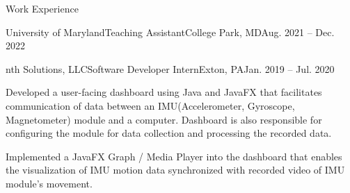 \documentclass{article}
\newlength{\tabin}
\newlength{\secsep}
\newcommand{\lineunder}{\vspace*{-8pt} \\ \hspace*{-6pt} \hrulefill \\ \vspace*{-15pt}}
\newenvironment{tabbedsection}[1]{
  \begin{list}{}{
      \setlength{\itemsep}{0pt}
      \setlength{\labelsep}{0pt}
      \setlength{\labelwidth}{0pt}
      \setlength{\leftmargin}{\tabin}
      \setlength{\rightmargin}{\tabin}
      \setlength{\listparindent}{0pt}
      \setlength{\parsep}{0pt}
      \setlength{\parskip}{0pt}
      \setlength{\partopsep}{0pt}
      \setlength{\topsep}{#1}
    }
  \item[]
}{\end{list}}
\newenvironment{resume_section}[1]{
  \filbreak
  \vspace{2\secsep}
  \textsc{\large#1}
  \lineunder
  \begin{tabbedsection}{\secsep}
}{\end{tabbedsection}}
\newenvironment{subitems}{
  \renewcommand{\labelitemi}{-}
  \begin{itemize}
      \setlength{\labelsep}{1em}
}{\end{itemize}}
\newenvironment{resume_employer}[4]{
  \vspace{\secsep}
  \textbf{#1} \\ 
  \indent {\small #2} \hfill {\footnotesize#3 (#4)} \hspace{-4em}
  \begin{tabbedsection}{0pt}
  \begin{subitems}
}{\end{subitems}\end{tabbedsection}}
\begin{document}
\begin{resume_section}{Work Experience}
\begin{resume_employer}{University of Maryland}{Teaching Assistant}{College Park, MD}{Aug. 2021 -- Dec. 2022}
\end{resume_employer}
  \begin{resume_employer}{nth Solutions, LLC}{Software Developer Intern}{Exton, PA}{Jan. 2019 -- Jul. 2020}
    \item Developed a user-facing dashboard using Java and JavaFX that facilitates communication of data between an IMU(Accelerometer, Gyroscope, Magnetometer) module and a computer. Dashboard is also responsible for configuring the module for data collection and processing the recorded data.
    \item Implemented a JavaFX Graph / Media Player into the dashboard that enables the visualization of IMU motion data synchronized with recorded video of IMU module's movement.
  \end{resume_employer}
  
\end{resume_section}
\end{document}

